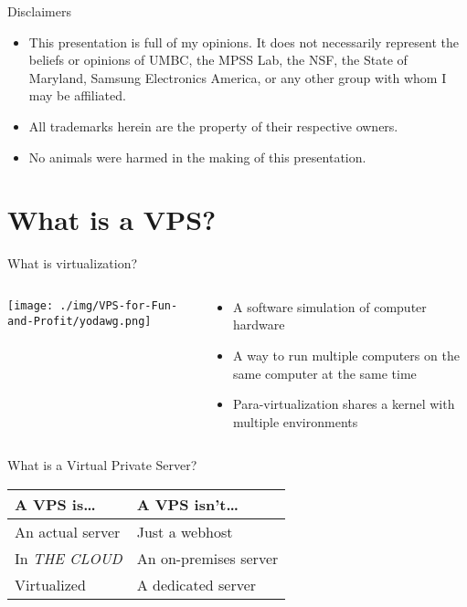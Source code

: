\documentclass[presentation,aspectratio=169]{beamer}
\begin{document}
\begin{frame}[label=sec-1-0-3]{Disclaimers}
\begin{itemize}
\item This presentation is full of my opinions. It does not necessarily represent 
the beliefs or opinions of UMBC, the MPSS Lab, the NSF, the State of 
Maryland, Samsung Electronics America, or any other group with whom I may be 
affiliated.
\item All trademarks herein are the property of their respective owners.
\item No animals were harmed in the making of this presentation.
\end{itemize}
\end{frame}
\section{What is a VPS?}
\label{sec-2}
\begin{frame}[label=sec-2-0-1]{What is virtualization?}
\begin{columns}
\begin{column}{0.35\textwidth}

\texttt{[image: ./img/VPS-for-Fun-and-Profit/yodawg.png]}
\end{column}

\begin{column}{0.6\textwidth}

\begin{itemize}
\item A software simulation of computer hardware
\item A way to run multiple computers on the same computer at the same time
\item Para-virtualization shares a kernel with multiple environments
\end{itemize}
\end{column}
\end{columns}
\end{frame}

\begin{frame}[label=sec-2-0-2]{What is a Virtual Private Server?}
\begin{Large}
\begin{center}
\begin{tabular}{ll}
A VPS is\ldots{} & A VPS isn't\ldots{}\\
\hline
An actual server & Just a webhost\\
In \emph{THE CLOUD} & An on-premises server\\
Virtualized & A dedicated server\\
\end{tabular}
\end{center}
\end{Large}
\end{frame}
\end{document}
